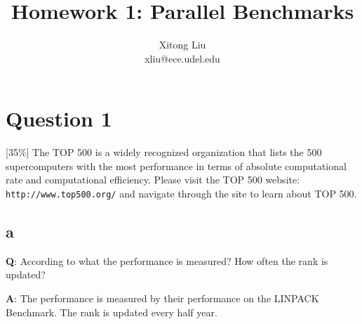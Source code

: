 \documentclass[12pt]{article}
\title{Homework 1: Parallel Benchmarks}
\author{Xitong Liu \\
xliu@ece.udel.edu}
\begin{document}
\maketitle

\section{Question 1}
[35\%] The TOP 500 is a widely recognized organization that lists the 500 supercomputers with the most performance in terms of absolute computational rate and computational efficiency. Please visit the TOP 500 website: \texttt{http://www.top500.org/} and navigate through the site to learn about TOP 500.

\subsection{a}
\textbf{Q}: 
According to what the performance is measured? How often the rank is updated?

\textbf{A}:
The performance is measured by their performance on the LINPACK Benchmark. The rank is updated every half year.
\end{document}
